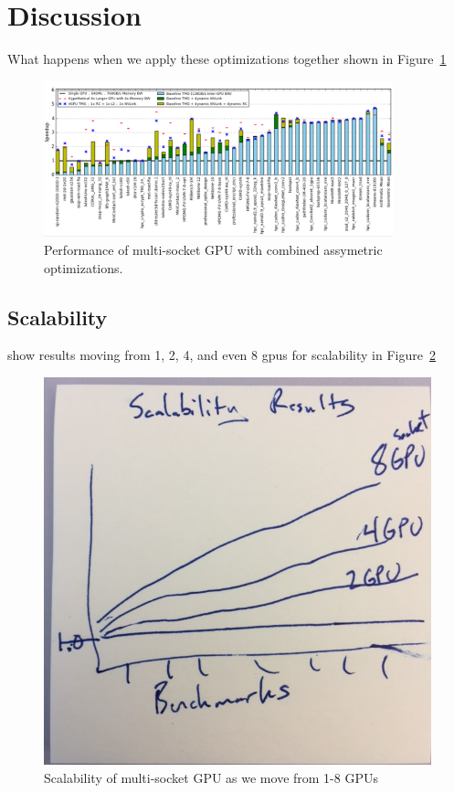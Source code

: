 \section {Discussion}

What happens when we apply these optimizations together shown in Figure~\ref{fig:combined}

\begin{figure}[tp]
    \centering
    \includegraphics[width=0.9\textwidth]{figures/resultscombined.jpg}
    \caption{Performance of multi-socket GPU with combined assymetric optimizations.}
    \label{fig:combined}
\end{figure}

\subsection {Scalability}

show results moving from 1, 2, 4, and even 8 gpus for scalability in Figure~\ref{fig:scalability}

\begin{figure}[tp]
    \centering
    \includegraphics[width=0.9\columnwidth]{figures/scalability.jpg}
    \caption{Scalability of multi-socket GPU as we move from 1-8 GPUs}
    \label{fig:scalability}
\end{figure}

